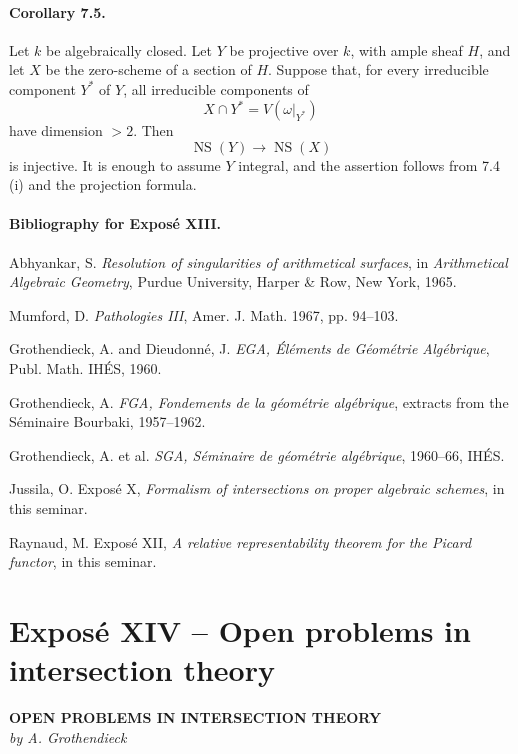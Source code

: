 \documentclass[11pt]{article}
\theoremstyle{plain}
\theoremstyle{definition}
\theoremstyle{remark}
\newcommand{\longto}{\longrightarrow}
\providecommand{\NS}{\operatorname{NS}}
\begin{document}
\paragraph{Corollary 7.5.}
Let $k$ be algebraically closed. Let $Y$ be projective over $k$, with ample sheaf $H$, and let $X$ be the zero-scheme of a section of $H$. Suppose that, for every irreducible component $Y^*$ of $Y$, all irreducible components of
\[
X\cap Y^*=V(\omega|_{Y^*})
\]
have dimension $>2$. Then
\[
\NS(Y)\longto \NS(X)
\]
is injective. It is enough to assume $Y$ integral, and the assertion follows from 7.4 (i) and the projection formula.

\paragraph{Bibliography for Exposé XIII.}
\begin{enumerate}[label={[\arabic*]}]
\item Abhyankar, S. \emph{Resolution of singularities of arithmetical surfaces}, in \emph{Arithmetical Algebraic Geometry}, Purdue University, Harper \& Row, New York, 1965.
\item Mumford, D. \emph{Pathologies III}, Amer. J. Math. 1967, pp. 94--103.
\item Grothendieck, A. and Dieudonné, J. \emph{EGA, Éléments de Géométrie Algébrique}, Publ. Math. IHÉS, 1960.
\item Grothendieck, A. \emph{FGA, Fondements de la géométrie algébrique}, extracts from the Séminaire Bourbaki, 1957--1962.
\item Grothendieck, A. et al. \emph{SGA, Séminaire de géométrie algébrique}, 1960--66, IHÉS.
\item Jussila, O. Exposé X, \emph{Formalism of intersections on proper algebraic schemes}, in this seminar.
\item Raynaud, M. Exposé XII, \emph{A relative representability theorem for the Picard functor}, in this seminar.
\end{enumerate}

\newpage
\section*{Exposé XIV -- Open problems in intersection theory}
\begin{center}
\large\textbf{OPEN PROBLEMS IN INTERSECTION THEORY}\\[0.25em]
\textit{by A. Grothendieck}
\end{center}
\end{document}
